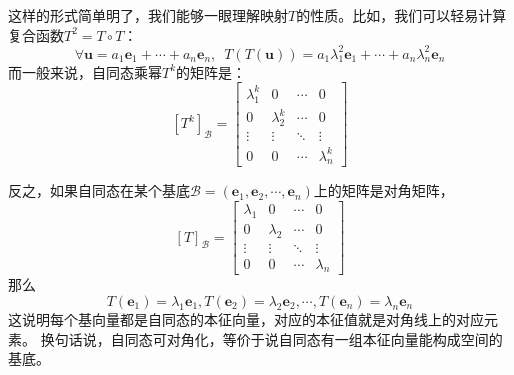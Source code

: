 \documentclass[12pt,UTF8]{ctexbook}
\begin{document}
这样的形式简单明了，我们能够一眼理解映射$T$的性质。比如，我们可以轻易计算复合函数$T^2 = T\circ T$：
$$  \forall \mathbf{u} = a_1 \mathbf{e}_1 + \cdots + a_n \mathbf{e}_n, \,\,\, T(T(\mathbf{u})) = a_1 \lambda_1^2 \mathbf{e}_1 + \cdots + a_n \lambda_n^2 \mathbf{e}_n$$
而一般来说，自同态乘幂$T^k$的矩阵是：
$$ [T^k]_{\mathcal{B}} = \begin{bmatrix} \lambda_1^k & 0 & \cdots & 0 \\ 0 & \lambda_2^k & \cdots & 0 \\ \vdots & \vdots & \ddots & \vdots \\ 0 & 0 & \cdots & \lambda_n^k \end{bmatrix}$$

反之，如果自同态在某个基底$\mathcal{B} = (\mathbf{e}_1, \mathbf{e}_2, \cdots, \mathbf{e}_n)$上的矩阵是对角矩阵，
$$ [T]_{\mathcal{B}} = \begin{bmatrix} \lambda_1 & 0 & \cdots & 0 \\ 0 & \lambda_2 & \cdots & 0 \\ \vdots & \vdots & \ddots & \vdots \\ 0 & 0 & \cdots & \lambda_n \end{bmatrix}$$
那么
$$ T(\mathbf{e}_1) = \lambda_1 \mathbf{e}_1, T(\mathbf{e}_2) = \lambda_2 \mathbf{e}_2, \cdots , T(\mathbf{e}_n) = \lambda_n \mathbf{e}_n$$
这说明每个基向量都是自同态的本征向量，对应的本征值就是对角线上的对应元素。
换句话说，自同态可对角化，等价于说自同态有一组本征向量能构成空间的基底。
\end{document}
